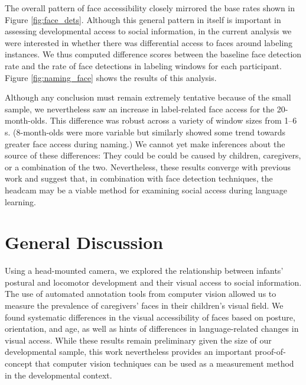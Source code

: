 \documentclass[a4paper,man,apacite,floatsintext,longtable]{apa6}
\begin{document}
The overall pattern of face accessibility closely mirrored the base
rates shown in Figure \ref{fig:face_dets}. Although this general pattern
in itself is important in assessing developmental access to social
information, in the current analysis we were interested in whether there
was differential access to faces around labeling instances. We thus
computed difference scores between the baseline face detection rate and
the rate of face detections in labeling windows for each participant.
Figure \ref{fig:naming_face} shows the results of this analysis.

Although any conclusion must remain extremely tentative because of the
small sample, we nevertheless saw an increase in label-related face
access for the 20-month-olds. This difference was robust across a
variety of window sizes from 1--6 s. (8-month-olds were more variable
but similarly showed some trend towards greater face access during
naming.) We cannot yet make inferences about the source of these
differences: They could be could be caused by children, caregivers, or a
combination of the two. Nevertheless, these results converge with
previous work and suggest that, in combination with face detection
techniques, the headcam may be a viable method for examining social
access during language learning.

\section{General Discussion}\label{general-discussion}

Using a head-mounted camera, we explored the relationship between
infants' postural and locomotor development and their visual access to
social information. The use of automated annotation tools from computer
vision allowed us to measure the prevalence of caregivers' faces in
their children's visual field. We found systematic differences in the
visual accessibility of faces based on posture, orientation, and age, as
well as hints of differences in language-related changes in visual
access. While these results remain preliminary given the size of our
developmental sample, this work nevertheless provides an important
proof-of-concept that computer vision techniques can be used as a
measurement method in the developmental context.
\end{document}
